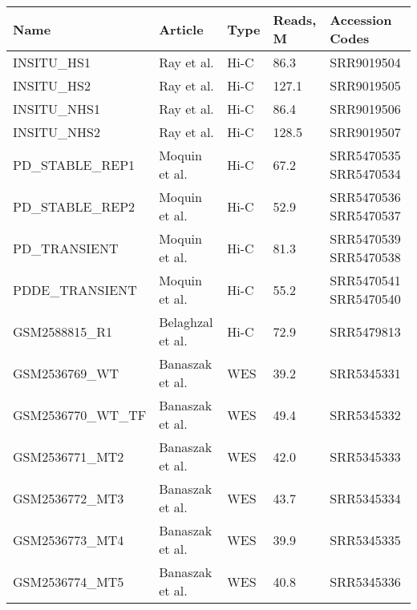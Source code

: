\documentclass[a4paper,12pt]{article}
\begin{document}
\begin{tabular}{| l | l | l | l | p{3cm} |}
\hline
\textbf{Name} & \textbf{Article} & \textbf{Type} & \textbf{Reads, M} & \textbf{Accession Codes} \\
\hline
INSITU\_HS1 & Ray et al.\cite{ray} & Hi-C & 86.3 & SRR9019504 \\
\hline
INSITU\_HS2 & Ray et al.\cite{ray} & Hi-C & 127.1 & SRR9019505 \\
\hline
INSITU\_NHS1 & Ray et al.\cite{ray} & Hi-C & 86.4 & SRR9019506 \\
\hline
INSITU\_NHS2 & Ray et al.\cite{ray} & Hi-C & 128.5 & SRR9019507 \\
\hline
PD\_STABLE\_REP1 & Moquin et al.\cite{moquin} & Hi-C & 67.2 & SRR5470535 SRR5470534 \\
\hline
PD\_STABLE\_REP2 & Moquin et al.\cite{moquin} & Hi-C & 52.9 & SRR5470536 SRR5470537 \\
\hline
PD\_TRANSIENT & Moquin et al.\cite{moquin} & Hi-C & 81.3 & SRR5470539 SRR5470538 \\
\hline
PDDE\_TRANSIENT & Moquin et al.\cite{moquin} & Hi-C & 55.2 & SRR5470541 SRR5470540 \\
\hline
GSM2588815\_R1 & Belaghzal et al.\cite{belaghzal} & Hi-C & 72.9 & SRR5479813 \\
\hline
GSM2536769\_WT & Banaszak et al.\cite{banaszak} & WES\footnotemark[1] & 39.2 & SRR5345331 \\
\hline
GSM2536770\_WT\_TF & Banaszak et al.\cite{banaszak} & WES\footnotemark[1] & 49.4 & SRR5345332 \\
\hline
GSM2536771\_MT2 & Banaszak et al.\cite{banaszak} & WES\footnotemark[1] & 42.0 & SRR5345333 \\
\hline
GSM2536772\_MT3 & Banaszak et al.\cite{banaszak} & WES\footnotemark[1] & 43.7 & SRR5345334 \\
\hline
GSM2536773\_MT4 & Banaszak et al.\cite{banaszak} & WES\footnotemark[1] & 39.9 & SRR5345335 \\
\hline
GSM2536774\_MT5 & Banaszak et al.\cite{banaszak} & WES\footnotemark[1] & 40.8 & SRR5345336 \\
\hline
\end{tabular}
\egroup


\end{document}

